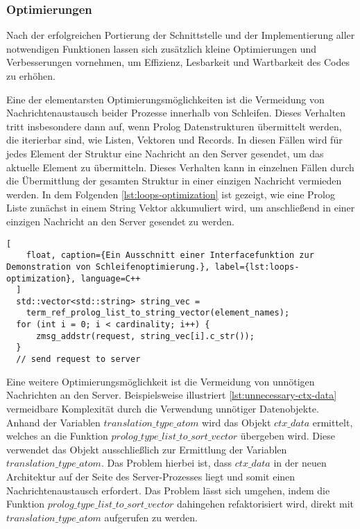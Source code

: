 \subsubsection{Optimierungen}
\label{subsec:optimizations}

Nach der erfolgreichen Portierung der Schnittstelle und der Implementierung aller notwendigen Funktionen
lassen sich zusätzlich kleine Optimierungen und Verbesserungen vornehmen, um Effizienz, Lesbarkeit und Wartbarkeit des Codes zu erhöhen.

Eine der elementarsten Optimierungsmöglichkeiten ist die Vermeidung von Nachrichtenaustausch beider Prozesse
innerhalb von Schleifen. Dieses Verhalten tritt insbesondere dann auf, wenn Prolog Datenstrukturen übermittelt werden,
die iterierbar sind, wie Listen, Vektoren und Records.
In diesen Fällen wird für jedes Element der Struktur eine Nachricht an den Server gesendet,
um das aktuelle Element zu übermitteln.
Dieses Verhalten kann in einzelnen Fällen durch die Übermittlung der gesamten Struktur in einer einzigen Nachricht vermieden werden.
In dem Folgenden \cref{lst:loops-optimization} ist gezeigt, wie eine Prolog Liste zunächst in einem String Vektor akkumuliert wird,
um anschließend in einer einzigen Nachricht an den Server gesendet zu werden.

\begin{lstlisting}[
    float, caption={Ein Ausschnitt einer Interfacefunktion zur Demonstration von Schleifenoptimierung.}, label={lst:loops-optimization}, language=C++
  ]
  std::vector<std::string> string_vec = 
    term_ref_prolog_list_to_string_vector(element_names);
  for (int i = 0; i < cardinality; i++) {
      zmsg_addstr(request, string_vec[i].c_str());
  }
  // send request to server
\end{lstlisting}

Eine weitere Optimierungsmöglichkeit ist die Vermeidung von unnötigen Nachrichten an den Server.
Beispielsweise illustriert \cref{lst:unnecessary-ctx-data} vermeidbare Komplexität durch die Verwendung unnötiger Datenobjekte.
Anhand der Variablen $translation\_type\_atom$ wird das Objekt $ctx\_data$ ermittelt, welches an die Funktion $prolog\_type\_list\_to\_sort\_vector$ übergeben wird.
Diese verwendet das Objekt ausschließlich zur Ermittlung der Variablen $translation\_type\_atom$. Das Problem hierbei ist,
dass $ctx\_data$ in der neuen Architektur auf der Seite des Server-Prozesses liegt und somit einen Nachrichtenaustausch erfordert.
Das Problem lässt sich umgehen, indem die Funktion $prolog\_type\_list\_to\_sort\_vector$ dahingehen refaktorisiert wird,
direkt mit $translation\_type\_atom$ aufgerufen zu werden.

